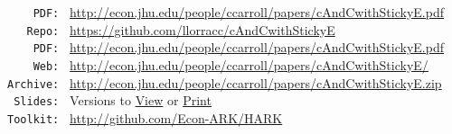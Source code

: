 \documentclass[titlepage]{\econtex}\newcommand{\texname}{cAndCwithStickyE}
\begin{document}
\parbox{\textwidth}{
  \begin{center}
\begin{tabbing}
  \texttt{~~~~PDF:~} \= \= \url{http://econ.jhu.edu/people/ccarroll/papers/cAndCwithStickyE.pdf} \kill \\  %
\texttt{~~~Repo:~} \= \= \url{https://github.com/llorracc/cAndCwithStickyE}  \\
\texttt{~~~~PDF:~} \> \> \url{http://econ.jhu.edu/people/ccarroll/papers/cAndCwithStickyE.pdf} \\
\texttt{~~~~Web:~} \> \> \url{http://econ.jhu.edu/people/ccarroll/papers/cAndCwithStickyE/} \\
\texttt{Archive:~} \> \> \url{http://econ.jhu.edu/people/ccarroll/papers/cAndCwithStickyE.zip} \\
\texttt{~Slides:~} \> \> Versions to \href{http://econ.jhu.edu/people/ccarroll/papers/cAndCwithStickyE-Slides.pdf}{View} or \href{http://econ.jhu.edu/people/ccarroll/papers/cAndCwithStickyE-Slides-Print.pdf}{Print} \\
\texttt{Toolkit:~} \> \> \url{http://github.com/Econ-ARK/HARK} \\
\end{tabbing}
\end{center}
}
\end{document}
